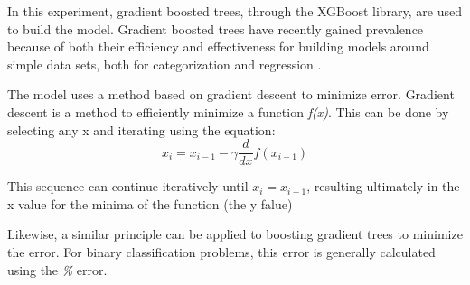 \documentclass[11pt]{article}
\begin{document}
     In this experiment, gradient boosted trees, through the XGBoost library, are used to build the model. Gradient boosted trees have recently gained prevalence because of both their efficiency and effectiveness for building models around simple data sets, both for categorization and regression \cite{one}.

     The model uses a method based on gradient descent to minimize error. Gradient descent is a method to efficiently minimize a function \textit{f(x)}. This can be done by selecting any x and iterating using the equation:
    \begin{equation}
      x_i = x_{i-1} - \gamma\frac{d}{dx}f(x_{i-1})
    \end{equation}

    This sequence can continue iteratively until $x_i = x_{i-1}$, resulting ultimately in the x value for the minima of the function (the y falue)

    Likewise, a similar principle can be applied to boosting gradient trees to minimize the error. For binary classification problems, this error is generally calculated using the \textit{\%} error.

    {}
    
  
\end{document}
